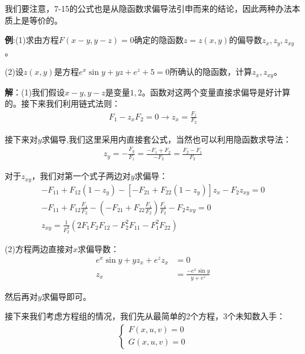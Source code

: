 \documentclass{ctexart}
\let\oldtextbf\textbf %
\renewcommand{\textbf}[1]{\textcolor{btex}{\oldtextbf{#1}}} %
\begin{document}
我们要注意，7-15的公式也是从隐函数求偏导法引申而来的结论，因此两种办法本质上是等价的。

\textbf{例}:(1)求由方程$F(x-y,y-z)=0$确定的隐函数$z=z(x,y)$的偏导数$z_x,z_y,z_{xy}$。

(2)设$z(x,y)$是方程$e^x\sin y+yz+e^z+5=0$所确认的隐函数，计算$z_x,z_{xy}$。

\textbf{解}：(1)我们假设$x-y,y-z$是变量$1,2$。函数对这两个变量直接求偏导是好计算的。接下来我们利用链式法则：
\begin{align*}
    F_1-z_xF_2=0\to z_x=\frac{F_1}{F_2}
\end{align*}

接下来对$y$求偏导,我们这里采用内直接套公式，当然也可以利用隐函数求导法：
\begin{align*}
    z_y=-\frac{F_y}{F_z}=\frac{-F_1+F_2}{-F_2}=\frac{F_2-F_1}{F_2}
\end{align*}

对于$z_{xy}$，我们对第一个式子两边对$y$求偏导：
\begin{align*}
    -F_{11}+F_{12}(1-z_y)-[-F_{21}+F_{22}(1-z_y)]z_x-F_2z_{xy}=0\\
-F_{11}+F_{12}\frac{F_1}{F_2}-(-F_{21}+F_{22}\frac{F_1}{F_2})\frac{F_1}{F_2}-F_2z_{xy}=0\\
z_{xy}=\frac{1}{F_2^3}(2F_1F_2F_{12}-F_2^2F_{11}-F_1^2F_{22})   
\end{align*}

(2)方程两边直接对$x$求偏导数：
\begin{align*}
    e^x\sin y+yz_x+e^zz_x&=0\\
    z_x&=\frac{-e^x\sin y}{y+e^z}
\end{align*}

然后再对$y$求偏导即可。

接下来我们考虑方程组的情况，我们先从最简单的2个方程，3个未知数入手：
\begin{align*}
    \begin{cases}
        F(x,u,v)=0\\
        G(x,u,v)=0
    \end{cases}
\end{align*}
\end{document}
